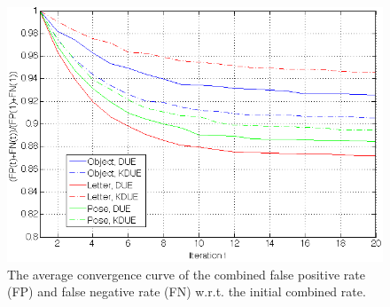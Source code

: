 \documentclass[10pt,twocolumn,letterpaper]{article}
\begin{document}
\begin{figure}
\begin{center}
\includegraphics[scale=0.25]{conv.png}
\end{center}
\caption{The average convergence curve of the combined false positive rate (FP) and false negative rate (FN) w.r.t. the initial combined rate.}
\label{conv}
\end{figure}
\end{document}
